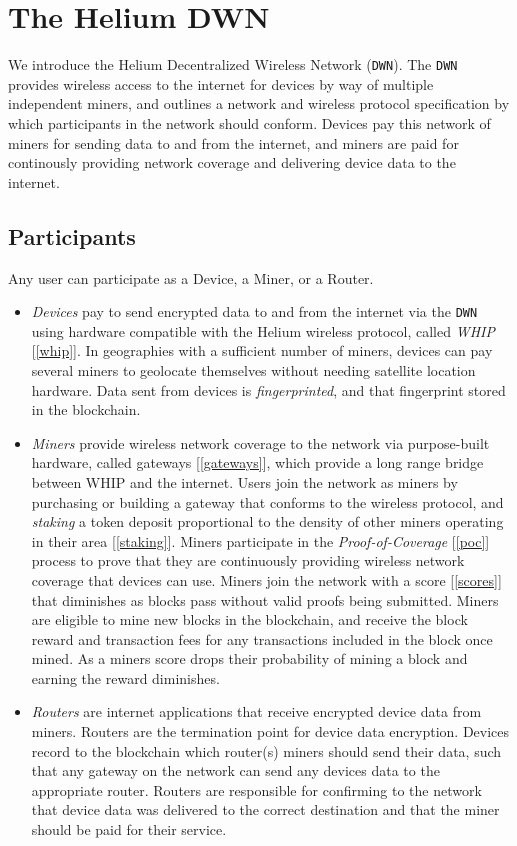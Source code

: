 \documentclass[letterpaper,11pt]{article}
\begin{document}
\newpage

\section{The Helium DWN}

We introduce the Helium Decentralized Wireless Network (\verb|DWN|). The \verb|DWN| provides wireless access to the internet for devices by way of multiple independent miners, and outlines a network and wireless protocol specification by which participants in the network should conform. Devices pay this network of miners for sending data to and from the internet, and miners are paid for continously providing network coverage and delivering device data to the internet.

\subsection{Participants}

Any user can participate as a Device, a Miner, or a Router.

\begin{itemize}
	\item \emph{Devices} pay to send encrypted data to and from the internet via the \verb|DWN| using hardware compatible with the Helium wireless protocol, called \emph{WHIP} [\ref{whip}]. In geographies with a sufficient number of miners, devices can pay several miners to geolocate themselves without needing satellite location hardware. Data sent from devices is \emph{fingerprinted}, and that fingerprint stored in the blockchain.
	\item \emph{Miners} provide wireless network coverage to the network via purpose-built hardware, called gateways [\ref{gateways}], which provide a long range bridge between WHIP and the internet. Users join the network as miners by purchasing or building a gateway that conforms to the wireless protocol, and \emph{staking} a token deposit proportional to the density of other miners operating in their area [\ref{staking}]. Miners participate in the \emph{Proof-of-Coverage} [\ref{poc}] process to prove that they are continuously providing wireless network coverage that devices can use. Miners join the network with a score [\ref{scores}] that diminishes as blocks pass without valid proofs being submitted. Miners are eligible to mine new blocks in the blockchain, and receive the block reward and transaction fees for any transactions included in the block once mined. As a miners score drops their probability of mining a block and earning the reward diminishes.
	\item \emph{Routers} are internet applications that receive encrypted device data from miners. Routers are the termination point for device data encryption. Devices record to the blockchain which router(s) miners should send their data, such that any gateway on the network can send any devices data to the appropriate router. Routers are responsible for confirming to the network that device data was delivered to the correct destination and that the miner should be paid for their service.
\end{itemize}
\end{document}
